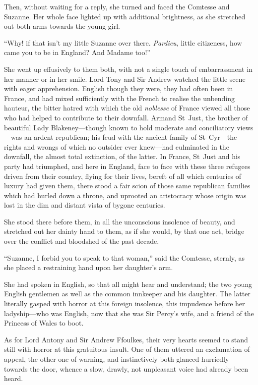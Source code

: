 Then, without waiting for a reply, she turned and faced the Comtesse and Suzanne. Her whole face lighted up with additional brightness, as she stretched out both arms towards the young girl.

\enquote{Why! if that isn't my little Suzanne over there. \textit{Pardieu}, little citizeness, how came you to be in England? And Madame too!}

She went up effusively to them both, with not a single touch of embarrassment in her manner or in her smile. Lord Tony and Sir Andrew watched the little scene with eager apprehension. English though they were, they had often been in France, and had mixed sufficiently with the French to realise the unbending hauteur, the bitter hatred with which the old \textit{noblesse} of France viewed all those who had helped to contribute to their downfall. Armand St~Just, the brother of beautiful Lady Blakeney---though known to hold moderate and conciliatory views---was an ardent republican; his feud with the ancient family of St~Cyr---the rights and wrongs of which no outsider ever knew---had culminated in the downfall, the almost total extinction, of the latter. In France, St~Just and his party had triumphed, and here in England, face to face with these three refugees driven from their country, flying for their lives, bereft of all which centuries of luxury had given them, there stood a fair scion of those same republican families which had hurled down a throne, and uprooted an aristocracy whose origin was lost in the dim and distant vista of bygone centuries.

She stood there before them, in all the unconscious insolence of beauty, and stretched out her dainty hand to them, as if she would, by that one act, bridge over the conflict and bloodshed of the past decade.

\enquote{Suzanne, I forbid you to speak to that woman,} said the Comtesse, sternly, as she placed a restraining hand upon her daughter's arm.

She had spoken in English, so that all might hear and understand; the two young English gentlemen as well as the common innkeeper and his daughter. The latter literally gasped with horror at this foreign insolence, this impudence before her ladyship---who was English, now that she was Sir Percy's wife, and a friend of the Princess of Wales to boot.

As for Lord Antony and Sir Andrew Ffoulkes, their very hearts seemed to stand still with horror at this gratuitous insult. One of them uttered an exclamation of appeal, the other one of warning, and instinctively both glanced hurriedly towards the door, whence a slow, drawly, not unpleasant voice had already been heard.

